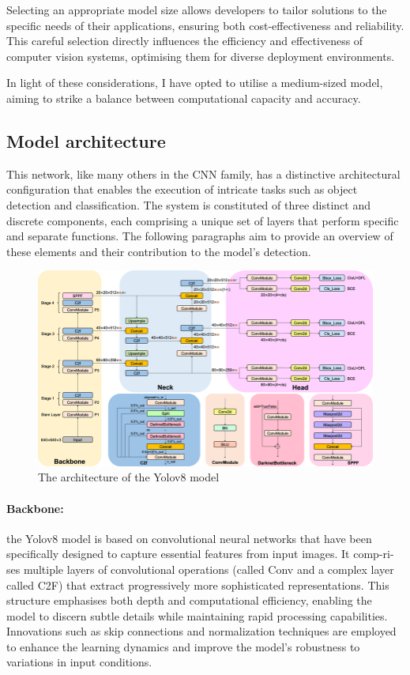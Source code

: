 Selecting an appropriate model size allows developers to tailor solutions to the specific needs of their applications, ensuring both cost-effectiveness and reliability.
This careful selection directly influences the efficiency and effectiveness of computer vision systems, optimising them for diverse deployment environments.

In light of these considerations, I have opted to utilise a medium-sized model, aiming to strike a balance between computational capacity and accuracy.

\subsection{Model architecture}\label{subsec:architecture}
This network, like many others in the CNN family, has a distinctive architectural configuration that
enables the execution of intricate tasks such as object detection and classification.
The system is constituted of three distinct and discrete components,
each comprising a unique set of layers that perform specific and separate functions.
The following paragraphs aim to provide an overview of these elements and their contribution to the model's detection.

\begin{figure}[ht]
\includegraphics[width=1.0\textwidth]{figures/Detailed-illustration-of-YOLOv8-model-architecture-The-Backbone-Neck-and-Head-are-the}
\caption{The architecture of the Yolov8 model~\cite{FractureDetection2024}}
\label{fig:architecture}
\end{figure}
\newpage
\paragraph{Backbone:}\label{par:backbone}
the Yolov8 model is based on convolutional neural networks that have been specifically designed to capture essential features from input images.
It comp-ri-ses multiple layers of convolutional operations (called Conv and a complex layer called C2F)
that extract progressively more sophisticated representations.
This structure emphasises both depth and computational efficiency,
enabling the model to discern subtle details while maintaining rapid processing capabilities.
Innovations such as skip connections and normalization techniques are employed to enhance the learning dynamics and improve the model's robustness to variations in input conditions.

